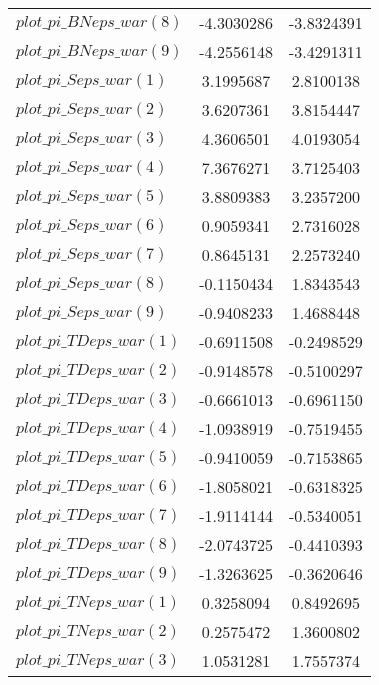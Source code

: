 \begin{center}
\begin{longtable}{lcc}
$plot\_pi\_BN eps\_war (8)   $	 & 	     -4.3030286	 & 	     -3.8324391 \\ 
$plot\_pi\_BN eps\_war (9)   $	 & 	     -4.2556148	 & 	     -3.4291311 \\ 
$plot\_pi\_S eps\_war (1)    $	 & 	      3.1995687	 & 	      2.8100138 \\ 
$plot\_pi\_S eps\_war (2)    $	 & 	      3.6207361	 & 	      3.8154447 \\ 
$plot\_pi\_S eps\_war (3)    $	 & 	      4.3606501	 & 	      4.0193054 \\ 
$plot\_pi\_S eps\_war (4)    $	 & 	      7.3676271	 & 	      3.7125403 \\ 
$plot\_pi\_S eps\_war (5)    $	 & 	      3.8809383	 & 	      3.2357200 \\ 
$plot\_pi\_S eps\_war (6)    $	 & 	      0.9059341	 & 	      2.7316028 \\ 
$plot\_pi\_S eps\_war (7)    $	 & 	      0.8645131	 & 	      2.2573240 \\ 
$plot\_pi\_S eps\_war (8)    $	 & 	     -0.1150434	 & 	      1.8343543 \\ 
$plot\_pi\_S eps\_war (9)    $	 & 	     -0.9408233	 & 	      1.4688448 \\ 
$plot\_pi\_TD eps\_war (1)   $	 & 	     -0.6911508	 & 	     -0.2498529 \\ 
$plot\_pi\_TD eps\_war (2)   $	 & 	     -0.9148578	 & 	     -0.5100297 \\ 
$plot\_pi\_TD eps\_war (3)   $	 & 	     -0.6661013	 & 	     -0.6961150 \\ 
$plot\_pi\_TD eps\_war (4)   $	 & 	     -1.0938919	 & 	     -0.7519455 \\ 
$plot\_pi\_TD eps\_war (5)   $	 & 	     -0.9410059	 & 	     -0.7153865 \\ 
$plot\_pi\_TD eps\_war (6)   $	 & 	     -1.8058021	 & 	     -0.6318325 \\ 
$plot\_pi\_TD eps\_war (7)   $	 & 	     -1.9114144	 & 	     -0.5340051 \\ 
$plot\_pi\_TD eps\_war (8)   $	 & 	     -2.0743725	 & 	     -0.4410393 \\ 
$plot\_pi\_TD eps\_war (9)   $	 & 	     -1.3263625	 & 	     -0.3620646 \\ 
$plot\_pi\_TN eps\_war (1)   $	 & 	      0.3258094	 & 	      0.8492695 \\ 
$plot\_pi\_TN eps\_war (2)   $	 & 	      0.2575472	 & 	      1.3600802 \\ 
$plot\_pi\_TN eps\_war (3)   $	 & 	      1.0531281	 & 	      1.7557374 \\ 

\end{longtable}
\end{center}

